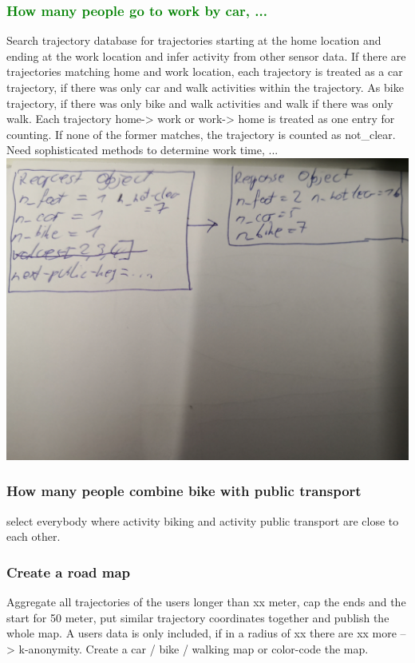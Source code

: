 \subsubsection{\textcolor{green}{How many people go to work by car, ...}}
Search trajectory database for trajectories starting at the home location and ending at the work location and infer activity from other sensor data.
If there are trajectories matching home and work location, each trajectory is treated as a car trajectory, if there was only car and walk activities within the trajectory.
As bike trajectory, if there was only bike and walk activities and walk if there was only walk.
Each trajectory home-> work or work-> home is treated as one entry for counting. If none of the former matches, the trajectory is counted as not\_clear.
Need sophisticated methods to determine work time, ... 
\includegraphics[width=\textwidth]{data/data-aggregation-transport-work-home.jpg}

\subsubsection{How many people combine bike with public transport}
select everybody where activity biking and activity public transport are close to each other.
\subsubsection{Create a road map}
Aggregate all trajectories of the users longer than xx meter, cap the ends and the start for 50 meter, put similar trajectory coordinates together and publish the whole map.
A users data is only included, if in a radius of xx there are xx more --> k-anonymity.
Create a car / bike / walking map or color-code the map.
